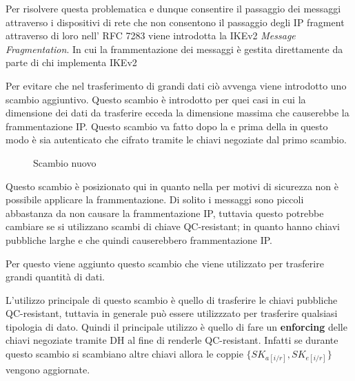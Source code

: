 Per risolvere questa problematica e dunque consentire il passaggio dei messaggi attraverso i dispositivi di rete che non consentono il passaggio degli IP fragment attraverso 
di loro nell' RFC 7283 viene introdotta la IKEv2 \textit{Message Fragmentation}. In cui la frammentazione dei messaggi è gestita direttamente da parte di chi implementa IKEv2


Per evitare che nel trasferimento di grandi dati ciò avvenga viene introdotto uno scambio aggiuntivo. Questo scambio è introdotto per quei casi in cui la dimensione dei dati
da trasferire ecceda la dimensione massima che causerebbe la frammentazione IP. Questo scambio va fatto dopo la  e prima della  in questo
modo è sia autenticato che cifrato tramite le chiavi negoziate dal primo scambio.

\begin{figure}[htbp]
    \centering
    \caption{Scambio nuovo}
    \label{fig:ikeintermediate}
\end{figure}

Questo scambio è posizionato qui in quanto nella  per motivi di sicurezza non è possibile applicare la frammentazione.
Di solito i messaggi sono piccoli abbastanza da non causare la frammentazione IP, tuttavia questo potrebbe cambiare se si utilizzano scambi di chiave QC-resistant; in quanto
hanno chiavi pubbliche larghe e che quindi causerebbero frammentazione IP.

Per questo viene aggiunto questo scambio che viene utilizzato per trasferire grandi quantità di dati.

L'utilizzo principale di questo scambio è quello di trasferire le chiavi pubbliche QC-resistant, tuttavia in generale può essere utilizzzato per trasferire qualsiasi tipologia di dato.
Quindi il principale utilizzo è quello di fare un \textbf{enforcing} delle chiavi negoziate tramite DH al fine di renderle QC-resistant. Infatti se durante questo scambio si scambiano 
altre chiavi allora le coppie $\{SK_{a[i/r]}, SK_{e[i/r]}\}$ vengono aggiornate.

